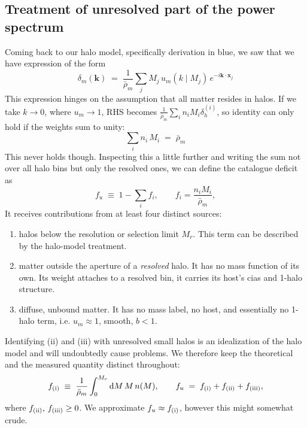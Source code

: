 \documentclass{article}
\newcommand{\dd}{\mathrm{d}}
\newcommand{\bx}{\mathbf{x}}
\newcommand{\bk}{\mathbf{k}}
\begin{document}
\subsection{Treatment of unresolved part of the power spectrum}
\label{sec:unresolved}

Coming back to our halo model, specifically derivation in blue, we saw that we have expression of the form
\begin{equation}
    \delta_m(\bk) \;=\; \frac{1}{\bar\rho_m} \sum_{j} M_j \, u_m(k \mid M_j) \, e^{-i \bk \cdot \bx_j} 
\end{equation}
This expression hinges on the assumption that all matter resides in halos. If we take $k \rightarrow 0$, where $u_m \rightarrow 1$, RHS becomes $\frac{1}{\bar \rho_m} \sum_i n_i M_i \delta_h^{(i)}$, so identity can only hold if the weights sum to unity:
\begin{equation}
\sum_i n_i \,M_i \;=\; \bar \rho_m
\end{equation}
This never holds though. Inspecting this a little further and writing the sum not over all halo bins but only the resolved ones, we can define the catalogue deficit as
\begin{equation} \label{eq:fu_cat}
f_u \;\equiv\; 1 - \sum_i f_i, \qquad f_i = \frac{n_i M_i}{\bar\rho_m},
\end{equation}
It receives contributions from at least four distinct sources:
\begin{enumerate}
    \item[(i)] halos below the resolution or selection limit $M_r$. This term can be described by the halo-model treatment.
    \item[(ii)] matter outside the aperture of a \emph{resolved} halo. It has no mass function of its own. Its weight attaches to a resolved bin, it carries its host's cias and 1-halo structure.
    \item[(iii)] diffuse, unbound matter. It has no mass label, no host, and essentially no 1-halo term, i.e. $u_m \approx 1$, smooth, $b < 1$.
\end{enumerate}
Identifying (ii) and (iii) with unresolved small halos is an idealization of the halo model and will undoubtedly cause problems. We therefore keep the theoretical and the measured quantity distinct throughout:
\begin{equation} \label{eq:fu_def}
    f_{\rm (i)} \;\equiv\; \frac{1}{\bar \rho_m} \int _0 ^{M_r} \dd M \, M \, n(M),
    \qquad
    f_u \;=\; f_{\rm (i)} + f_{\rm (ii)} + f_{\rm (iii)},
\end{equation}
where $f_{\rm (ii)}, \,f_{\rm (iii)} \ge 0$. We approximate $f_u \approx f_{\rm (i)}$, however this might somewhat crude.
\end{document}
